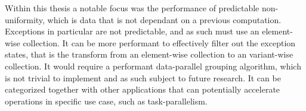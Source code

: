 \documentclass{article}
\begin{document}
Within this thesis a notable focus was the performance of predictable non-uniformity, which is data that is not dependant on a previous computation.
Exceptions in particular are not predictable, and as such must use an element-wise collection.
It can be more performant to effectively filter out the exception states, that is the transform from an element-wise collection to an variant-wise collection.
It would require a performant data-parallel grouping algorithm, which is not trivial to implement and as such subject to future research.
It can be categorized together with other applications that can potentially accelerate operations in specific use case, such as task-parallelism. 

\newpage




\end{document}
